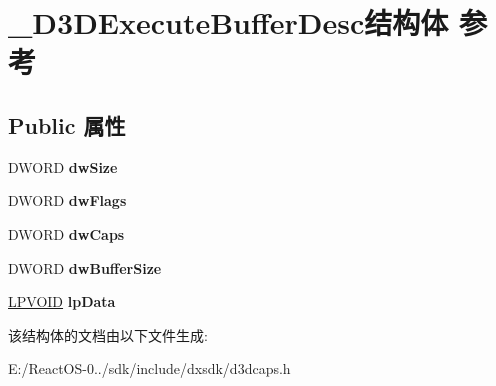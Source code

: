 \hypertarget{struct___d3_d_execute_buffer_desc}{}\section{\+\_\+\+D3\+D\+Execute\+Buffer\+Desc结构体 参考}
\label{struct___d3_d_execute_buffer_desc}
\subsection*{Public 属性}
\begin{DoxyCompactItemize}
\item 
\mbox{\label{struct___d3_d_execute_buffer_desc_a00ff594d2a0623c84cdb6474fe4fcd27}} 
D\+W\+O\+RD {\bfseries dw\+Size}
\item 
\mbox{\label{struct___d3_d_execute_buffer_desc_a198c2ae70caff733d140cb9ab42f1249}} 
D\+W\+O\+RD {\bfseries dw\+Flags}
\item 
\mbox{\label{struct___d3_d_execute_buffer_desc_a84a999dde2aae394ad47194a0563e9d6}} 
D\+W\+O\+RD {\bfseries dw\+Caps}
\item 
\mbox{\label{struct___d3_d_execute_buffer_desc_a606b3efe5a1e6360cdb6771c02cb52bb}} 
D\+W\+O\+RD {\bfseries dw\+Buffer\+Size}
\item 
\mbox{\label{struct___d3_d_execute_buffer_desc_a66e4bc1fc08c20268c4dd379ef57f601}} 
\hyperlink{interfacevoid}{L\+P\+V\+O\+ID} {\bfseries lp\+Data}
\end{DoxyCompactItemize}


该结构体的文档由以下文件生成\+:\begin{DoxyCompactItemize}
\item 
E\+:/\+React\+O\+S-\/0../sdk/include/dxsdk/d3dcaps.\+h\end{DoxyCompactItemize}
